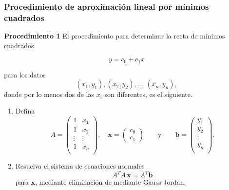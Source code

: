 {\nologo
\begin{frame}\frametitle{Procedimiento de aproximación lineal por mínimos cuadrados}
	
	\vspace{-3mm}
	\begin{ejem}{\textbf{Procedimiento 1}}
		\justifying
		El procedimiento para determinar la recta de mínimos cuadrados 
		
		\vspace{-2mm}
		\[
			y = c_0 + c_1 x
		\] 
		
		\vspace{-2mm}
		para los datos 
		\[
			(x_1, y_1 ), (x_2, y_2 ), \hdots ,(x_n , y_n ),
		\]
		 donde por lo menos dos de las $x_i$ son diferentes, es el siguiente.
		\begin{enumerate}\justifying
			\item Defina
					\[						
						A = 
						\left(
						\begin{array}{cc}
						1 & x_1 \\[1mm]
						1 & x_2 \\[1mm]
						\vdots & \vdots \\[1mm]
						1 & x_n \\[1mm]
						\end{array}
						\right),
						\quad
						\mathbf{x} = 
						\left(
						\begin{array}{c}
						c_0 \\[1mm]
						c_1 
						\end{array}
						\right)
						\qquad \text{y} \qquad 
						\mathbf{b} = 
						\left(
						\begin{array}{c}
						y_1  \\[1mm]
						y_2 \\[1mm]
						\vdots \\[1mm]
						y_n\\[1mm]
						\end{array}
						\right).
					\]
			\item Resuelva el sistema de ecuaciones normales
				\[
					A^TA\, \mathbf{x} = A^T\mathbf{b}
				\]		
				para $\mathbf{x}$, mediante eliminación de mediante Gauss-Jordan.
		\end{enumerate}
	\end{ejem}		
	
\end{frame}
}


